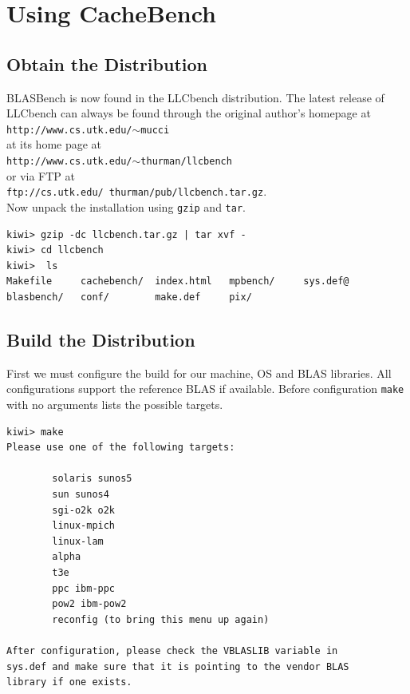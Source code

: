 \documentclass [12pt]{article}
\begin{document}
\section{Using CacheBench}

\subsection{Obtain the Distribution}

BLASBench is now found in the LLCbench distribution.
The latest release of LLCbench can always be found through the original author's homepage at \\
{\tt http://www.cs.utk.edu/$\sim$mucci} \\ at its home page at \\ 
{\tt http://www.cs.utk.edu/$\sim$thurman/llcbench} \\
or via FTP at \\ {\tt ftp://cs.utk.edu/~thurman/pub/llcbench.tar.gz}.\\

Now unpack the installation using {\tt gzip} and {\tt tar}.

\begin{verbatim}
kiwi> gzip -dc llcbench.tar.gz | tar xvf -
kiwi> cd llcbench
kiwi>  ls
Makefile     cachebench/  index.html   mpbench/     sys.def@
blasbench/   conf/        make.def     pix/

\end{verbatim}

\subsection{Build the Distribution}

First we must configure the build for our machine, OS and BLAS libraries. All
configurations support the reference BLAS if available. Before configuration 
{\tt make} with no arguments lists the possible targets.

\begin{verbatim}
kiwi> make
Please use one of the following targets:

        solaris sunos5
        sun sunos4
        sgi-o2k o2k
        linux-mpich
        linux-lam
        alpha
        t3e
        ppc ibm-ppc
        pow2 ibm-pow2
        reconfig (to bring this menu up again)

After configuration, please check the VBLASLIB variable in 
sys.def and make sure that it is pointing to the vendor BLAS
library if one exists.

\end{verbatim}
\end{document}
